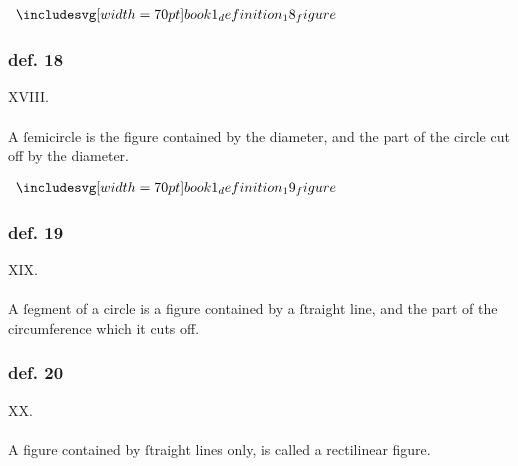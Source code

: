 \hfill

\begin{minipage}{0.33\textwidth}
    \begin{center}
        $\img[0][0][70]{book1_definition_18_figure}$
    \end{center}
\end{minipage}%
\begin{minipage}{0.67\textwidth}
    \subsubsection{def. 18}
    \begin{center}
        XVIII.\label{book1def18}\\
        \hfill\\
        A ſemicircle is the figure contained by the diameter, and the part of the circle cut off by the diameter.
    \end{center}
\end{minipage}

\hfill

\begin{minipage}{0.33\textwidth}
    \begin{center}
        $\img[0][0][70]{book1_definition_19_figure}$
    \end{center}
\end{minipage}%
\begin{minipage}{0.67\textwidth}
    \subsubsection{def. 19}
    \begin{center}
        XIX.\label{book1def19}\\
        \hfill\\
        A ſegment of a circle is a figure contained by a ſtraight line, and the part of the circumference which it cuts off.
    \end{center}
\end{minipage}

\hfill

\begin{minipage}{0.33\textwidth}
    \phantom{}
\end{minipage}%
\begin{minipage}{0.67\textwidth}
    \subsubsection{def. 20}
    \begin{center}
        XX.\label{book1def20}\\
        \hfill\\
        A figure contained by ſtraight lines only, is called a rectilinear figure.\\
    \end{center}
\end{minipage}

